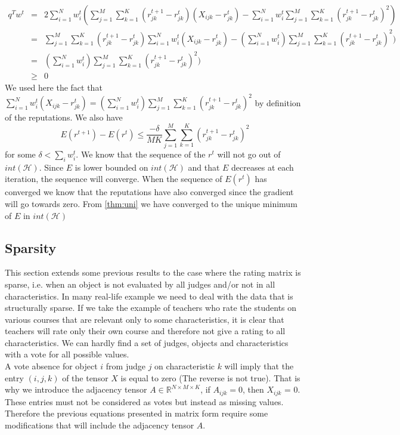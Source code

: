 \documentclass[12pt,a4paper]{article}
\begin{document}
\begin{eqnarray*}
q^Tw^t & = & 2 \sum_{i=1}^N w^t_i (\sum_{j=1}^M \sum_{k=1}^K (r^{t+1}_{jk}-r^t_{jk})(X_{ijk}-r^t_{jk}) - \sum_{i=1}^N w^t_i \sum_{j=1}^M \sum_{k=1}^K  (r^{t+1}_{jk} - r^t_{jk})^2)\\
& = & \sum_{j=1}^M \sum_{k=1}^K (r^{t+1}_{jk}-r^t_{jk}) \sum_{i=1}^N w^t_i (X_{ijk}-r_{jk}^t)- (\sum_{i=1}^N w^t_i) \sum_{j=1}^M \sum_{k=1}^K  (r^{t+1}_{jk} - r^t_{jk})^2)\\
& = & (\sum_{i=1}^N w^t_i) \sum_{j=1}^M \sum_{k=1}^K  (r^{t+1}_{jk} - r^t_{jk})^2)\\
& \geq & 0
\end{eqnarray*}
We used here the fact that $\sum_{i=1}^N w^t_i (X_{ijk}-r_{jk}^t) = (\sum_{i=1}^N w^t_i) \sum_{j=1}^M \sum_{k=1}^K  (r^{t+1}_{jk} - r^t_{jk})^2$ by definition of the reputations.
We also have 
$$E(r^{t+1})- E(r^t) \leq \frac{-\delta}{MK} \sum_{j=1}^M \sum_{k=1}^K (r^{t+1}_{jk} - r^t_{jk})^2$$
for some $\delta < \sum_i w_i^t$.
We know that the sequence of the $r^t$ will not go out of $int(\mathcal{H})$.
Since $E$ is lower bounded on $int(\mathcal{H})$ and that $E$ decreases at each iteration, the sequence will converge. When the sequence of $E(r^t)$ has converged we know that the reputations have also converged since the gradient will go towards zero. From \ref{thm:uni} we have converged to the unique minimum of $E$ in $int(\mathcal{H})$


\subsection{Sparsity}

This section extends some previous results to the case where the rating matrix is sparse, i.e. when an object is not evaluated by all judges and/or not in all characteristics. In many real-life example we need to deal with the data that is structurally sparse. If we take the example of teachers who rate the students on various courses that are relevant only to some characteristics, it is clear that teachers will rate only their own course and therefore not give a rating to all characteristics. We can hardly find a set of judges, objects and characteristics with a vote for all possible values.\\

A vote absence for object $i$ from judge $j$ on characteristic $k$ will imply that the entry $(i, j, k)$ of the tensor $X$ is equal to zero (The reverse is not true). That is why we introduce the adjacency tensor $A \in \mathbb{R}^{N \times M \times K}$, if $A_{ijk} = 0$, then $X_{ijk}$ = 0. These entries must not be considered as votes but instead as missing values. Therefore the previous equations presented in matrix form require some modifications that will include the adjacency tensor $A$.
\end{document}
